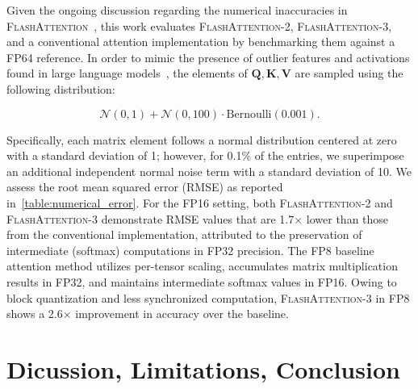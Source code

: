 \begin{itemize}
Given the ongoing discussion regarding the numerical inaccuracies in \textsc{FlashAttention}~\citep{golden2024flash}, this work evaluates \textsc{FlashAttention-2}, \textsc{FlashAttention-3}, and a conventional attention implementation by benchmarking them against a FP64 reference. In order to mimic the presence of outlier features and activations found in large language models~\citep{dettmers2208llm, sun2024massive}, the elements of $\mathbf{Q}, \mathbf{K}, \mathbf{V}$ are sampled using the following distribution:

\begin{equation*}
  \mathcal{N}(0, 1) + \mathcal{N}(0, 100) \cdot \mathrm{Bernoulli}(0.001).
\end{equation*}

Specifically, each matrix element follows a normal distribution centered at zero with a standard deviation of 1; however, for 0.1\% of the entries, we superimpose an additional independent normal noise term with a standard deviation of 10. We assess the root mean squared error (RMSE) as reported in~\cref{table:numerical_error}. For the FP16 setting, both \textsc{FlashAttention-2} and \textsc{FlashAttention-3} demonstrate RMSE values that are 1.7$\times$ lower than those from the conventional implementation, attributed to the preservation of intermediate (softmax) computations in FP32 precision. The FP8 baseline attention method utilizes per-tensor scaling, accumulates matrix multiplication results in FP32, and maintains intermediate softmax values in FP16. Owing to block quantization and less synchronized computation, \textsc{FlashAttention-3} in FP8 shows a 2.6$\times$ improvement in accuracy over the baseline.

\section{Dicussion, Limitations, Conclusion}
\label{sec:discussion}


\end{itemize}
